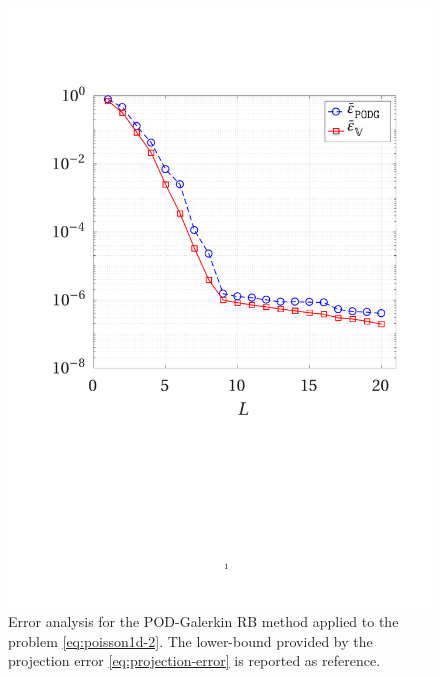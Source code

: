 \documentclass[12pt, a4paper, twoside, openright, notitlepage]{report}
\numberwithin{equation}{chapter}
\theoremstyle{theorem}
\theoremstyle{definition}
\theoremstyle{remark}
\theoremstyle{proposition}
\numberwithin{figure}{chapter}
\begin{document}
		\begin{figure}[b!]
			\center
			\includegraphics[scale = 0.38, trim = {1cm 9cm 1.5cm 3.5cm}, clip]{poisson1d_2_error_vs_rank}
			
			\caption{Error analysis for the POD-Galerkin RB method applied to the problem \eqref{eq:poisson1d-2}. The lower-bound provided by the projection error \eqref{eq:projection-error} is reported as reference.}
			\label{fig:poisson1d-2-fig1}
		\end{figure}
	
\end{document}
